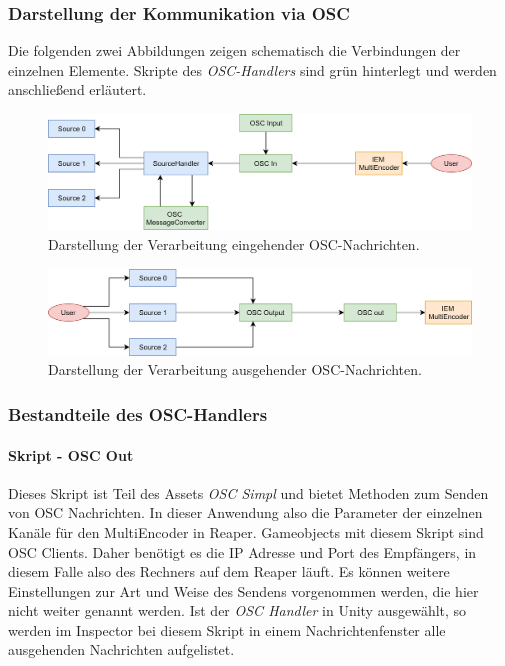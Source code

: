 \documentclass[11pt, titlepage, fleqn]{report}
\begin{document}
                \subsubsection{Darstellung der Kommunikation via OSC}
                    Die folgenden zwei Abbildungen zeigen schematisch die Verbindungen der einzelnen Elemente. Skripte des \textit{OSC-Handlers} 
                    sind grün hinterlegt und werden anschließend erläutert.
                    \vspace{1cm}
                    \begin{figure}[htbp]
                        \centering
                        \includegraphics[width=\linewidth]{./img/eingehend.png}
                        \caption{Darstellung der Verarbeitung eingehender OSC-Nachrichten.\label{fig:in}}
                    \end{figure}
                \vspace{1cm}
                    \begin{figure}[htbp]
                        \centering
                        \includegraphics[width=\linewidth]{./img/ausgehend.png}
                        \caption{Darstellung der Verarbeitung ausgehender 
                        OSC-Nachrichten.\label{fig:out}}
                    \end{figure}
                	\pagebreak
                \subsubsection{Bestandteile des OSC-Handlers}
                    \paragraph{Skript - OSC Out}
                    Dieses Skript ist Teil des Assets \textit{OSC Simpl} und 
                    bietet Methoden zum Senden von OSC Nachrichten. 
                    In dieser Anwendung  also die Parameter der einzelnen Kanäle für den MultiEncoder in Reaper. 
                    Gameobjects mit diesem Skript sind OSC Clients. Daher benötigt es die IP Adresse und Port des 
                    Empfängers, in diesem Falle also des Rechners auf dem Reaper läuft. Es können weitere Einstellungen 
                    zur Art und Weise des Sendens vorgenommen werden, die hier nicht weiter genannt werden.
                    Ist der \textit{OSC Handler} in Unity ausgewählt, so werden 
                    im Inspector bei diesem Skript in einem 
                    Nachrichtenfenster alle ausgehenden Nachrichten aufgelistet.
\end{document}
